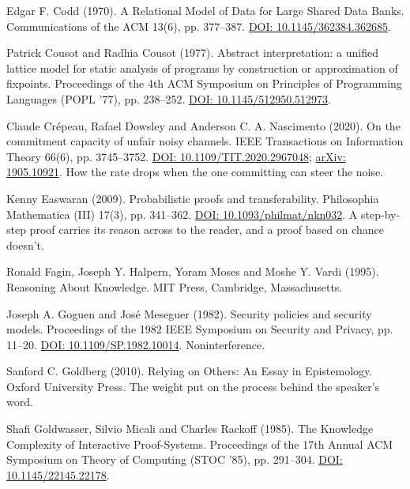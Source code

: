\documentclass[11pt,twoside]{article}
\theoremstyle{thielethm}
\theoremstyle{thieledef}
\theoremstyle{thieledef}
\theoremstyle{thieledef}
\theoremstyle{thielethm}
\theoremstyle{thieleobs}
\theoremstyle{thielethm}
\begin{document}
\noindent Edgar F. Codd (1970). A Relational Model of Data for Large Shared Data Banks. Communications of the ACM 13(6), pp. 377--387. \href{https://doi.org/10.1145/362384.362685}{DOI: 10.1145/362384.362685}.
\par\medskip

\noindent Patrick Cousot and Radhia Cousot (1977). Abstract interpretation: a unified lattice model for static analysis of programs by construction or approximation of fixpoints. Proceedings of the 4th ACM Symposium on Principles of Programming Languages (POPL '77), pp. 238--252. \href{https://doi.org/10.1145/512950.512973}{DOI: 10.1145/512950.512973}.
\par\medskip

\noindent Claude Cr\'epeau, Rafael Dowsley and Anderson C. A. Nascimento (2020). On the commitment capacity of unfair noisy channels. IEEE Transactions on Information Theory 66(6), pp. 3745--3752. \href{https://doi.org/10.1109/TIT.2020.2967048}{DOI: 10.1109/TIT.2020.2967048}; \href{https://arxiv.org/abs/1905.10921}{arXiv: 1905.10921}. How the rate drops when the one committing can steer the noise.
\par\medskip

\noindent Kenny Easwaran (2009). Probabilistic proofs and transferability. Philosophia Mathematica (III) 17(3), pp. 341--362. \href{https://doi.org/10.1093/philmat/nkn032}{DOI: 10.1093/philmat/nkn032}. A step-by-step proof carries its reason across to the reader, and a proof based on chance doesn't.
\par\medskip

\noindent Ronald Fagin, Joseph Y. Halpern, Yoram Moses and Moshe Y. Vardi (1995). Reasoning About Knowledge. MIT Press, Cambridge, Massachusetts.
\par\medskip

\noindent Joseph A. Goguen and Jos\'e Meseguer (1982). Security policies and security models. Proceedings of the 1982 IEEE Symposium on Security and Privacy, pp. 11--20. \href{https://doi.org/10.1109/SP.1982.10014}{DOI: 10.1109/SP.1982.10014}. Noninterference.
\par\medskip

\noindent Sanford C. Goldberg (2010). Relying on Others: An Essay in Epistemology. Oxford University Press. The weight put on the process behind the speaker's word.
\par\medskip

\noindent Shafi Goldwasser, Silvio Micali and Charles Rackoff (1985). The Knowledge Complexity of Interactive Proof-Systems. Proceedings of the 17th Annual ACM Symposium on Theory of Computing (STOC '85), pp. 291--304. \href{https://doi.org/10.1145/22145.22178}{DOI: 10.1145/22145.22178}.
\par\medskip
\end{document}
